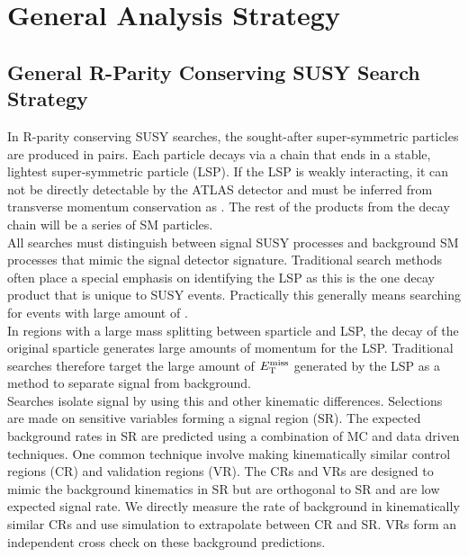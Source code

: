 \chapter{General Analysis Strategy}
\label{chap:AnaStrategy}
\section{General R-Parity Conserving SUSY Search Strategy}

\indent In R-parity conserving SUSY searches, the sought-after super-symmetric particles are produced in pairs.  Each particle decays via a chain that ends in a stable, lightest super-symmetric particle (LSP).  If the LSP is weakly interacting, it can not be directly detectable by the ATLAS detector and must be inferred from transverse momentum conservation as \MET.  The rest of the products from the decay chain will be a series of SM particles.  ~\\

\indent All searches must distinguish between signal SUSY processes and background SM processes that mimic the signal detector signature.  Traditional search methods often place a special emphasis on identifying the LSP as this is the one decay product that is unique to SUSY events.  Practically this generally means searching for events with large amount of \MET.  \\

\indent In regions with a large mass splitting between sparticle and LSP, the decay of the original sparticle generates large amounts of momentum for the LSP.  Traditional searches therefore target the large amount of $E_{\mathrm{T}}^{\mathrm{miss}}$ generated by the LSP as a method to separate signal from background. ~\\

\indent Searches isolate signal by using this and other kinematic differences.  Selections are made on sensitive variables forming a signal region (SR).  The expected background rates in SR are predicted using a combination of MC and data driven techniques.  One common technique involve making kinematically similar control regions (CR) and validation regions (VR). The CRs and VRs are designed to mimic the background kinematics in SR but are orthogonal to SR and are low expected signal rate.  We directly measure the rate of background in kinematically similar CRs and use simulation to extrapolate between CR and SR.  VRs form an independent cross check on these background predictions. \\

